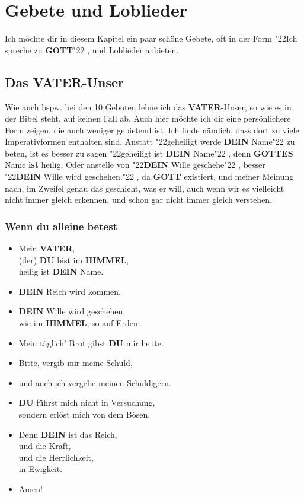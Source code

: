 \documentclass[10pt,a5paper]{article}
\newcommand{\Dein}[0]{\textbf{DEIN}}
\newcommand{\Du}[0]{\textbf{DU}}
\newcommand{\Gottes}[0]{\textbf{GOTTES}}
\newcommand{\Gott}[0]{\textbf{GOTT}}
\newcommand{\Himmel}[0]{\textbf{HIMMEL}}
\newcommand{\Vater}[0]{\textbf{VATER}}
\newcommand{\q}[1]{\char"22{#1}\char"22 }
\begin{document}
	\newpage
	\section{Gebete und Loblieder}
		Ich m\"ochte dir in diesem Kapitel ein paar sch\"one Gebete,
		oft in der Form \q{Ich spreche zu {\Gott}},
		und Loblieder anbieten.	
	
	\subsection{Das {\Vater}-Unser}
		Wie auch bspw. bei den 10 Geboten lehne ich das {\Vater}-Unser,
		so wie es in der Bibel steht,
		auf keinen Fall ab.
		Auch hier m\"ochte ich dir eine pers\"onlichere Form zeigen,
		die auch weniger gebietend ist.
		Ich finde n\"amlich,
		dass dort zu viele Imperativformen enthalten sind.
		Anstatt \q{geheiligt werde {\Dein} Name} zu beten,
		ist es besser zu sagen \q{geheiligt ist {\Dein} Name},
		denn {\Gottes} Name \textbf{ist} heilig.
		Oder anstelle von \q{{\Dein} Wille geschehe},
		besser \q{{\Dein} Wille wird geschehen.},
		da {\Gott} existiert,
		und meiner Meinung nach,
		im Zweifel genau das geschieht,
		was er will,
		auch wenn wir es vielleicht nicht immer gleich erkennen,
		und schon gar nicht immer gleich verstehen.
	
	\subsubsection{Wenn du alleine betest}
		\begin{itemize}[nosep]
			\item	Mein {\Vater},
					\\
					(der) {\Du} bist im {\Himmel},
					\\
					heilig ist {\Dein} Name.
			\item	{\Dein} Reich wird kommen.
			\item	{\Dein} Wille wird geschehen,
					\\
					wie im {\Himmel},
					so auf Erden.
			\item	Mein t\"aglich' Brot gibst {\Du} mir heute.
			\item	Bitte,
					vergib mir meine Schuld,
			\item[]	und auch ich vergebe meinen Schuldigern.
			\item	{\Du} f\"uhrst mich nicht in Versuchung,
					\\
					sondern erl\"ost mich von dem B\"osen.
			\item	Denn {\Dein} ist das Reich,
					\\
					und die Kraft,
					\\
					und die Herrlichkeit,
					\\
					in Ewigkeit.
			\item	Amen!
		\end{itemize}
			
\end{document}

